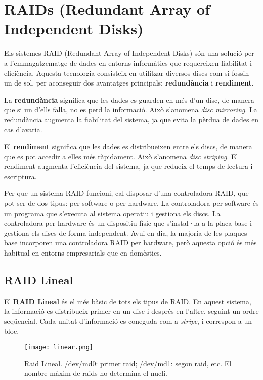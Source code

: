 \chapter{RAIDs (Redundant Array of Independent
Disks)}\label{raids-redundant-array-of-independent-disks}

Els sistemes RAID (Redundant Array of Independent Disks) són una solució
per a l'emmagatzematge de dades en entorns informàtics que requereixen
fiabilitat i eficiència. Aquesta tecnologia consisteix en utilitzar
diversos discs com si fossin un de sol, per aconseguir dos avantatges
principals: \textbf{redundància} i \textbf{rendiment}.

La \textbf{redundància} significa que les dades es guarden en més d'un
disc, de manera que si un d'ells falla, no es perd la informació. Això
s'anomena \emph{disc mirroring}. La redundància augmenta la fiabilitat
del sistema, ja que evita la pèrdua de dades en cas d'avaria.

El \textbf{rendiment} significa que les dades es distribueixen entre els
discs, de manera que es pot accedir a elles més ràpidament. Això
s'anomena \emph{disc striping}. El rendiment augmenta l'eficiència del
sistema, ja que redueix el temps de lectura i escriptura.

Per que un sistema RAID funcioni, cal disposar d'una controladora RAID,
que pot ser de dos tipus: per software o per hardware. La controladora
per software és un programa que s'executa al sistema operatiu i gestiona
els discs. La controladora per hardware és un dispositiu físic que
s'instal·la a la placa base i gestiona els discs de forma independent.
Avui en dia, la majoria de les plaques base incorporen una controladora
RAID per hardware, però aquesta opció és més habitual en entorns
empresarials que en domèstics.


\section{RAID Lineal}\label{raid-lineal}

El \textbf{RAID Lineal} és el més bàsic de tots els tipus de RAID. En aquest sistema, la informació es distribueix primer en un disc i després en l'altre, seguint un ordre seqüencial. Cada unitat d'informació es coneguda com a \textit{stripe}, i correspon a un bloc.

\begin{figure}[!htb]
    \centering
    \texttt{[image: linear.png]}
    \caption{Raid Lineal. /dev/md0: primer raid;  /dev/md1: segon raid, etc. El nombre màxim de raids ho determina el nucli.}
    \label{fig:raid-lineal}
\end{figure}


